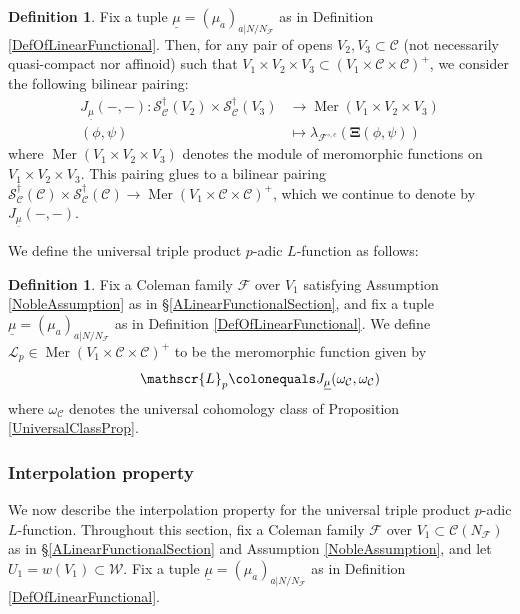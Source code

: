 \documentclass[10pt, oneside]{amsart}
\newcommand{\defeq}{\colonequals}
\numberwithin{equation}{subsection}
\theoremstyle{definition}
\newtheorem{definition}[equation]{Definition}
\theoremstyle{remark}
\newcommand{\opn}[1]{\operatorname{#1}}
\begin{document}
\begin{definition} \label{DefJmu}
Fix a tuple $\underline{\mu} = (\mu_a)_{a | N/N_{\mathcal{F}}}$ as in Definition \ref{DefOfLinearFunctional}. Then, for any pair of opens $V_2, V_3 \subset \mathcal{C}$ (not necessarily quasi-compact nor affinoid) such that $V_1 \times V_2 \times V_3 \subset (V_1 \times \mathcal{C} \times \mathcal{C})^+$, we consider the following bilinear pairing:
\begin{align*} 
J_{\underline{\mu}}( -, -) \colon  \mathcal{S}^{\dagger}_{\mathcal{C}}(V_2) \times \mathcal{S}^{\dagger}_{\mathcal{C}}(V_3)  &\to  \opn{Mer}(V_1 \times V_2 \times V_3) \\
 (\phi, \psi) &\mapsto \lambda_{\mathcal{F}^{\circ, c}} \left( {\boldsymbol\Xi}(\phi, \psi)\right)
\end{align*}
where $\opn{Mer}(V_1 \times V_2 \times V_3)$ denotes the module of meromorphic functions on $V_1 \times V_2 \times V_3$. This pairing glues to a bilinear pairing $\mathcal{S}^{\dagger}_{\mathcal{C}}(\mathcal{C}) \times \mathcal{S}^{\dagger}_{\mathcal{C}}(\mathcal{C}) \to \opn{Mer}(V_1 \times \mathcal{C} \times \mathcal{C})^+$, which we continue to denote by $J_{\underline{\mu}}( -, -)$. 
\end{definition}

We define the universal triple product $p$-adic $L$-function as follows:

\begin{definition}
    Fix a Coleman family $\mathcal{F}$ over $V_1$ satisfying Assumption \ref{NobleAssumption} as in \S \ref{ALinearFunctionalSection}, and fix a tuple $\underline{\mu} = (\mu_a)_{a | N/N_{\mathcal{F}}}$ as in Definition \ref{DefOfLinearFunctional}. We define $\mathscr{L}_p \in \opn{Mer}(V_1 \times \mathcal{C} \times \mathcal{C})^+$ to be the meromorphic function given by
    \[
    \mathscr{L}_p \defeq J_{\underline{\mu}}(\omega_{\mathcal{C}}, \omega_{\mathcal{C}})
    \]
    where $\omega_{\mathcal{C}}$ denotes the universal cohomology class of Proposition \ref{UniversalClassProp}.
\end{definition}


\subsubsection{Interpolation property}

We now describe the interpolation property for the universal triple product $p$-adic $L$-function. Throughout this section, fix a Coleman family $\mathcal{F}$ over $V_1 \subset \mathcal{C}(N_{\mathcal{F}})$ as in \S \ref{ALinearFunctionalSection} and Assumption \ref{NobleAssumption}, and let $U_1 = w(V_1) \subset \mathcal{W}$. Fix a tuple $\underline{\mu} = (\mu_a)_{a | N/N_{\mathcal{F}}}$ as in Definition \ref{DefOfLinearFunctional}.
\end{document}
